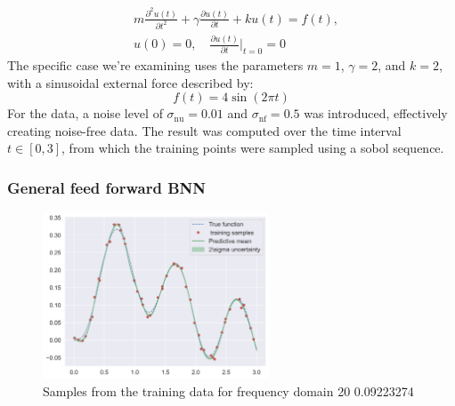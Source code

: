 \documentclass{article}
\begin{document}
\begin{align}
    & m\frac{\partial^2 u(t)}{\partial t^2} + \gamma \frac{\partial u(t)}{\partial t} + k u(t) = f(t), \\
    & u(0) = 0, \quad \frac{\partial u(t)}{\partial t}\bigg|_{t=0} = 0
\end{align}
The specific case we're examining uses the parameters \( m = 1 \), \( \gamma = 2 \), and \( k = 2 \), with a sinusoidal external force described by:
\begin{equation}
    f(t) = 4 \sin(2\pi t)
\end{equation}
For the data, a noise level of $\sigma_{\text{nu}} = 0.01$ and $\sigma_{\text{nf}} = 0.5$ was introduced, effectively creating noise-free data. The result was computed over the time interval \( t \in [0,3] \), from which the training points were sampled using a sobol sequence. 

\subsubsection{General feed forward BNN}

\begin{figure}[h]
    \centering
    \includegraphics[width=0.6\textwidth]{plots/BNN/oscilator1_50_[20, 20, 1].png}
    \caption{Samples from the training data for frequency domain 20  0.09223274}
    \label{fig:training_samples}
\end{figure}
\end{document}
